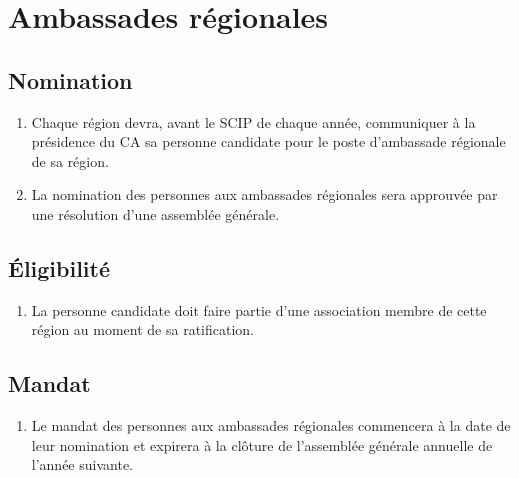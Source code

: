 \section{Ambassades régionales}
\label{ambassades-regionales}

\subsection{Nomination}
\label{ambassades-regionales-nomination}

\begin{enumerate}
 \item Chaque région devra, avant le SCIP de chaque année, communiquer à la présidence du CA sa personne candidate pour le poste d'ambassade régionale de sa région.
 \item La nomination des personnes aux ambassades régionales sera approuvée par une résolution d'une assemblée générale.
\end{enumerate}

\subsection{Éligibilité}
\label{ambassades-regionales-eligibilite}

\begin{enumerate}
 \item La personne candidate doit faire partie d'une association membre de cette région au moment de sa ratification.
\end{enumerate}

\subsection{Mandat}
\label{ambassades-regionales-mandat}

\begin{enumerate}
 \item Le mandat des personnes aux ambassades régionales commencera à la date de leur nomination et expirera à la clôture de l'assemblée générale annuelle de l'année suivante.
\end{enumerate}
